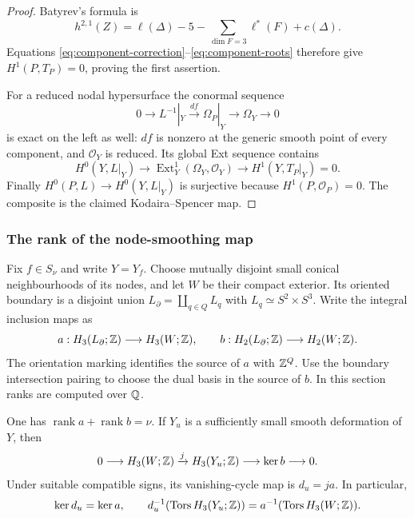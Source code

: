 \begin{proof}
Batyrev's formula \cite[Thm.~4.3.7]{Batyrev} is
\[
 h^{2,1}(Z)=\ell(\Delta)-5-
 \sum_{\dim F=3}\ell^*(F)+c(\Delta).
\]
Equations \eqref{eq:component-correction}--\eqref{eq:component-roots} therefore give
$H^1(P,T_P)=0$, proving the first assertion.

For a reduced nodal hypersurface the conormal sequence
\[
 0\longrightarrow L^{-1}|_Y\xrightarrow{df}
 \Omega_P|_Y\longrightarrow\Omega_Y\longrightarrow0
\]
is exact on the left as well: $df$ is nonzero at the generic smooth
point of every component, and $\mathcal O_Y$ is reduced.
Its global Ext sequence contains
\[
 H^0(Y,L|_Y)\longrightarrow\operatorname{Ext}^1_Y(\Omega_Y,\mathcal O_Y)
 \longrightarrow H^1(Y,T_P|_Y)=0.
\]
Finally $H^0(P,L)\to H^0(Y,L|_Y)$ is surjective because
$H^1(P,\mathcal O_P)=0$. The composite is the claimed
Kodaira--Spencer map.
\end{proof}

\subsubsection*{The rank of the node-smoothing map}

Fix $f\in S_\nu$ and write $Y=Y_f$. Choose mutually disjoint small
conical neighbourhoods of its nodes, and let $W$ be their compact
exterior. Its oriented boundary is a disjoint union
$L_\partial=\coprod_{q\in Q}L_q$ with $L_q\simeq S^2\times S^3$.
Write the integral inclusion maps as
\begin{equation}\label{eq:component-ab}
 a:H_3(L_\partial;\mathbb Z)\longrightarrow H_3(W;\mathbb Z),\qquad
 b:H_2(L_\partial;\mathbb Z)\longrightarrow H_2(W;\mathbb Z).
\end{equation}
The orientation marking identifies the source of $a$ with $\mathbb Z^Q$.
Use the boundary intersection pairing to choose the dual basis in the
source of $b$. In this section ranks are computed over $\mathbb Q$.

\begin{lemma}\label{lem:component-topology}
One has $\operatorname{rank} a+\operatorname{rank} b=\nu$. If $Y_u$ is a sufficiently small
smooth deformation of $Y$, then
\begin{equation}\label{eq:component-integralmv}
 0\longrightarrow H_3(W;\mathbb Z)\xrightarrow{j}H_3(Y_u;\mathbb Z)
 \longrightarrow\ker b\longrightarrow0.
\end{equation}
Under suitable compatible signs, its vanishing-cycle map is $d_u=j a$.
In particular,
\begin{equation}\label{eq:component-torsioncomparison}
 \ker d_u=\ker a,\qquad
 d_u^{-1}(\operatorname{Tors} H_3(Y_u;\mathbb Z))=a^{-1}(\operatorname{Tors} H_3(W;\mathbb Z)).
\end{equation}
\end{lemma}

